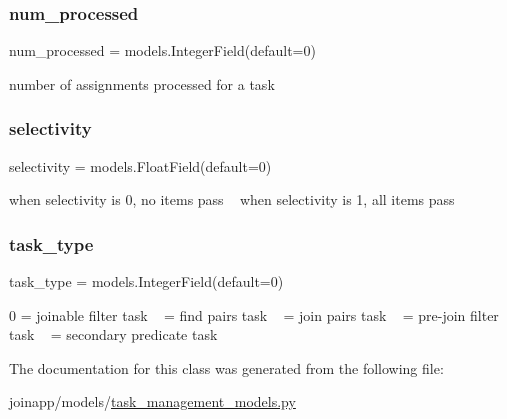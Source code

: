 \subsubsection{\texorpdfstring{num\_processed}{num\_processed}}
{\footnotesize\ttfamily num\+\_\+processed = models.\+Integer\+Field(default=0)\hspace{0.3cm}{\ttfamily [static]}}



number of assignments processed for a task 

\mbox{\label{classjoinapp_1_1models_1_1task__management__models_1_1_task_stats_af0e245c39a758c26c7eadd206d81ae15}} 
\subsubsection{\texorpdfstring{selectivity}{selectivity}}
{\footnotesize\ttfamily selectivity = models.\+Float\+Field(default=0)\hspace{0.3cm}{\ttfamily [static]}}



when selectivity is 0, no items pass ~\newline
 when selectivity is 1, all items pass 

\mbox{\label{classjoinapp_1_1models_1_1task__management__models_1_1_task_stats_ab8d9e3d1f9fdf95a31d7b4ce32768eab}} 
\subsubsection{\texorpdfstring{task\_type}{task\_type}}
{\footnotesize\ttfamily task\+\_\+type = models.\+Integer\+Field(default=0)\hspace{0.3cm}{\ttfamily [static]}}



0 = joinable filter task ~ = find pairs task ~ = join pairs task ~ = pre-\/join filter task ~ = secondary predicate task 



The documentation for this class was generated from the following file\+:\begin{DoxyCompactItemize}
\item 
joinapp/models/\mbox{\hyperlink{task__management__models_8py}{task\+\_\+management\+\_\+models.\+py}}\end{DoxyCompactItemize}
